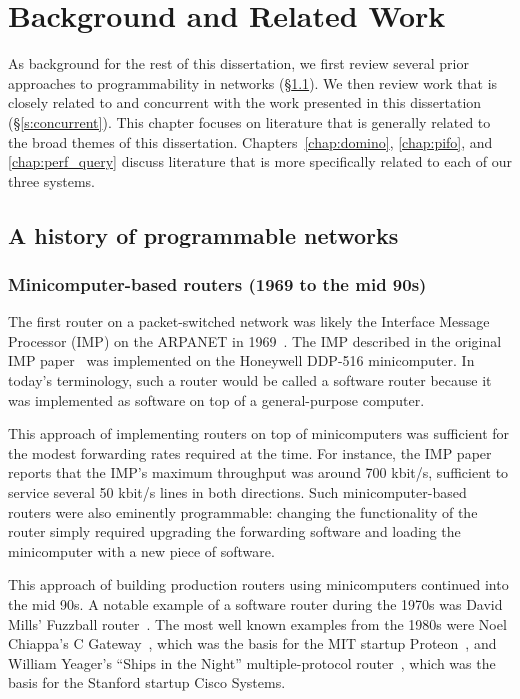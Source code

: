 \chapter{Background and Related Work}
\label{chap:related}

As background for the rest of this dissertation, we first review several prior
approaches to programmability in networks (\S\ref{s:bgnd_bgnd}). We then review
work that is closely related to and concurrent with the work presented in this
dissertation (\S\ref{s:concurrent}).  This chapter focuses on literature that
is generally related to the broad themes of this dissertation.
Chapters~\ref{chap:domino}, \ref{chap:pifo}, and \ref{chap:perf_query} discuss
literature that is more specifically related to each of our three systems.

\section{A history of programmable networks}
\label{s:bgnd_bgnd}

\subsection{Minicomputer-based routers (1969 to the mid 90s)}
The first router on a packet-switched network was likely the Interface Message
Processor (IMP) on the ARPANET in 1969~\cite{imp}. The IMP described in the
original IMP paper~\cite{imp} was implemented on the Honeywell DDP-516
minicomputer. In today's terminology, such a router would be called a software
router because it was implemented as software on top of a general-purpose
computer.

This approach of implementing routers on top of minicomputers was sufficient
for the modest forwarding rates required at the time. For instance, the IMP
paper reports that the IMP's maximum throughput was around 700 kbit/s,
sufficient to service several 50 kbit/s lines in both directions.  Such
minicomputer-based routers were also eminently programmable: changing the
functionality of the router simply required upgrading the forwarding software
and loading the minicomputer with a new piece of software.

This approach of building production routers using minicomputers continued into
the mid 90s.  A notable example of a software router during the 1970s was David
Mills' Fuzzball router~\cite{fuzzball}. The most well known examples from the
1980s were Noel Chiappa's C Gateway~\cite{cgw}, which was the basis for the MIT
startup Proteon~\cite{proteon}, and William Yeager's ``Ships in the Night''
multiple-protocol router~\cite{ships}, which was the basis for the Stanford
startup Cisco Systems.

